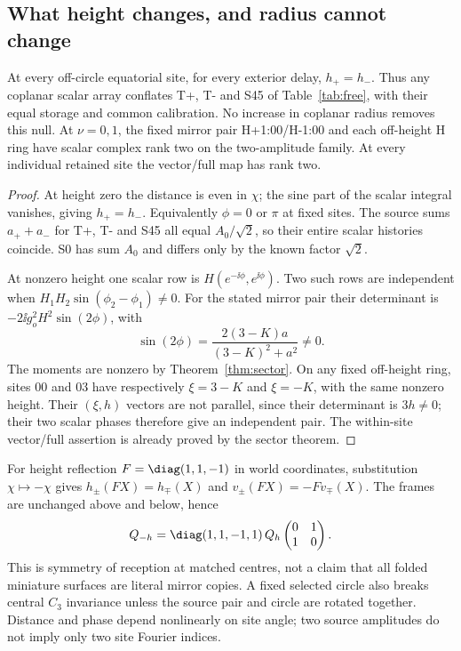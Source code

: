 \subsection{What height changes, and radius cannot change}
\begin{theorem}\label{thm:height}
At every off-circle equatorial site, for every exterior delay, $h_+=h_-$. Thus any coplanar scalar array conflates T+, T- and S45 of Table~\ref{tab:free}, with their equal storage and common calibration. No increase in coplanar radius removes this null. At $\nu=0,1$, the fixed mirror pair H+1:00/H-1:00 and each off-height H ring have scalar complex rank two on the two-amplitude family. At every individual retained site the vector/full map has rank two.
\end{theorem}
\begin{proof}
At height zero the distance is even in $\chi$; the sine part of the scalar integral vanishes, giving $h_+=h_-$. Equivalently $\phi=0$ or $\pi$ at fixed sites. The source sums $a_++a_-$ for T+, T- and S45 all equal $A_0/\sqrt2$, so their entire scalar histories coincide. S0 has sum $A_0$ and differs only by the known factor $\sqrt2$.

At nonzero height one scalar row is $H(e^{-\ii\phi},e^{\ii\phi})$. Two such rows are independent when $H_1H_2\sin(\phi_2-\phi_1)\ne0$. For the stated mirror pair their determinant is $-2\ii g_o^2H^2\sin(2\phi)$, with
\begin{equation}\label{eq:mirrorminor}
 \sin(2\phi)=\frac{2(3-K)a}{(3-K)^2+a^2}\ne0.
\end{equation}
The moments are nonzero by Theorem~\ref{thm:sector}. On any fixed off-height ring, sites 00 and 03 have respectively $\xi=3-K$ and $\xi=-K$, with the same nonzero height. Their $(\xi,h)$ vectors are not parallel, since their determinant is $3h\ne0$; their two scalar phases therefore give an independent pair. The within-site vector/full assertion is already proved by the sector theorem.
\end{proof}

For height reflection $F=\diag(1,1,-1)$ in world coordinates, substitution $\chi\mapsto-\chi$ gives $h_\pm(FX)=h_\mp(X)$ and $v_\pm(FX)=-Fv_\mp(X)$. The frames are unchanged above and below, hence
\begin{equation}\label{eq:mirrorQ}
 Q_{-h}=\diag(1,1,-1,1)\,Q_h
 \begin{pmatrix}0&1\\1&0\end{pmatrix}.
\end{equation}
This is symmetry of reception at matched centres, not a claim that all folded miniature surfaces are literal mirror copies. A fixed selected circle also breaks central $C_3$ invariance unless the source pair and circle are rotated together. Distance and phase depend nonlinearly on site angle; two source amplitudes do not imply only two site Fourier indices.

